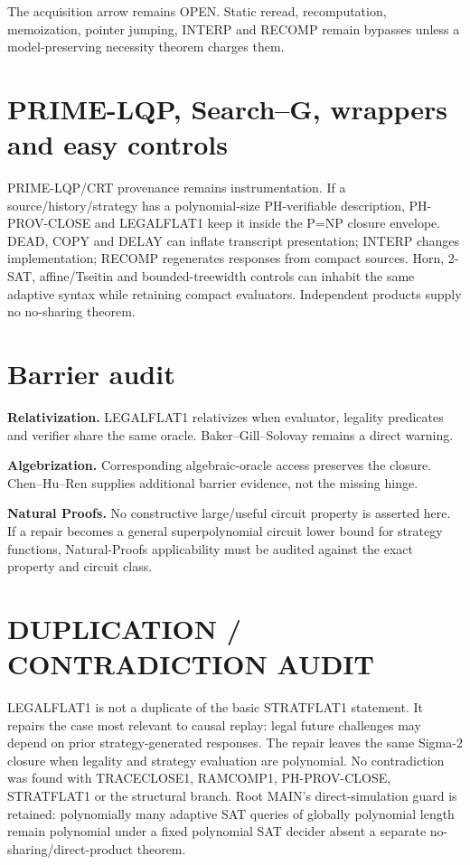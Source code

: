 \documentclass[11pt]{article}
\begin{document}
The acquisition arrow remains OPEN. Static reread, recomputation, memoization, pointer jumping, INTERP and RECOMP remain bypasses unless a model-preserving necessity theorem charges them.

\section*{PRIME-LQP, Search--G, wrappers and easy controls}
PRIME-LQP/CRT provenance remains instrumentation. If a source/history/strategy has a polynomial-size PH-verifiable description, PH-PROV-CLOSE and LEGALFLAT1 keep it inside the P=NP closure envelope. DEAD, COPY and DELAY can inflate transcript presentation; INTERP changes implementation; RECOMP regenerates responses from compact sources. Horn, 2-SAT, affine/Tseitin and bounded-treewidth controls can inhabit the same adaptive syntax while retaining compact evaluators. Independent products supply no no-sharing theorem.

\section*{Barrier audit}
\textbf{Relativization.} LEGALFLAT1 relativizes when evaluator, legality predicates and verifier share the same oracle. Baker--Gill--Solovay remains a direct warning.

\textbf{Algebrization.} Corresponding algebraic-oracle access preserves the closure. Chen--Hu--Ren supplies additional barrier evidence, not the missing hinge.

\textbf{Natural Proofs.} No constructive large/useful circuit property is asserted here. If a repair becomes a general superpolynomial circuit lower bound for strategy functions, Natural-Proofs applicability must be audited against the exact property and circuit class.

\section*{DUPLICATION / CONTRADICTION AUDIT}
LEGALFLAT1 is not a duplicate of the basic STRATFLAT1 statement. It repairs the case most relevant to causal replay: legal future challenges may depend on prior strategy-generated responses. The repair leaves the same Sigma-2 closure when legality and strategy evaluation are polynomial. No contradiction was found with TRACECLOSE1, RAMCOMP1, PH-PROV-CLOSE, STRATFLAT1 or the structural branch. Root MAIN's direct-simulation guard is retained: polynomially many adaptive SAT queries of globally polynomial length remain polynomial under a fixed polynomial SAT decider absent a separate no-sharing/direct-product theorem.
\end{document}
